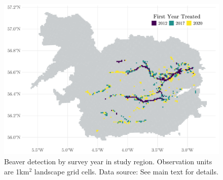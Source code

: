 \begin{figure}
    \centering
    \includegraphics[width=0.7\linewidth]{output/figures/beaver_first_year_treated.pdf}
    \caption{Beaver detection by survey year in study region. Observation units are 1km$^2$ landscape grid cells. Data source: See main text for details.}
    \label{fig:enter-label}
\end{figure}


